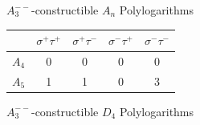 \documentclass[11pt]{article}
\begin{document}
\begin{table}
\begin{center}

$A_3^{--}$-constructible $A_n$ Polylogarithms
\vspace{.2cm}

\begin{tabular}{ c |  c | c | c | c }      
  & $\sigma^+\tau^+$ & $\sigma^+\tau^-$ & $\sigma^-\tau^+$ & $\sigma^-\tau^-$ \\
\hline
$A_4$ & 0 & 0 & 0 & 0 \\
\hline
$A_5$ & 1 & 1 & 0 & 3
\end{tabular} 

\vspace{.6cm}
$A_3^{--}$-constructible $D_4$ Polylogarithms
\vspace{.2cm}


\end{center}
\end{table}
\end{document}
